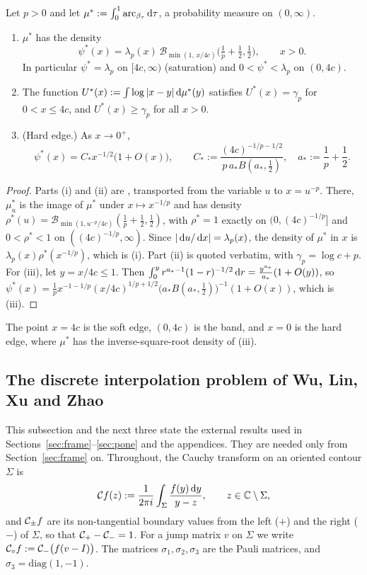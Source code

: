 \begin{proposition}\label{prop:equilibrium}
Let $p>0$ and let $\mu^*:=\int_0^1\mathrm{arc}_{\beta_\tau}\,\mathrm{d}\tau$, a probability measure on $(0,\infty)$.
\begin{enumerate}
\item[\textup{(i)}] $\mu^*$ has the density
  \[
    \psi^*(x)=\lambda_p(x)\,\mathcal B_{\min(1,\,x/4c)}\bigl(\tfrac1p+\tfrac12,\tfrac12\bigr),\qquad x>0 .
  \]
  In particular $\psi^*=\lambda_p$ on $[4c,\infty)$ (saturation) and $0<\psi^*<\lambda_p$ on $(0,4c)$.
\item[\textup{(ii)}] The function $U^*(x):=\int\log|x-y|\,\mathrm{d}\mu^*(y)$ satisfies $U^*(x)=\gamma_p$ for $0<x\le4c$, and
  $U^*(x)\ge\gamma_p$ for all $x>0$.
\item[\textup{(iii)}] \textup{(}Hard edge.\textup{)} As $x\to0^+$,
  \[
    \psi^*(x)=C_*x^{-1/2}\bigl(1+O(x)\bigr),\qquad C_*:=\frac{(4c)^{-1/p-1/2}}{p\,a_*B(a_*,\frac12)},\quad
    a_*:=\frac1p+\frac12 .
  \]
\end{enumerate}
\end{proposition}

\begin{proof}
Parts (i) and (ii) are \cite[Theorem~1.3(i)--(ii)]{Paper1}, transported from the variable $u$ to $x=u^{-p}$. There,
$\mu^*_u$ is the image of $\mu^*$ under $x\mapsto x^{-1/p}$ and has density
$\rho^*(u)=\mathcal B_{\min(1,u^{-p}/4c)}(\frac1p+\frac12,\frac12)$, with $\rho^*=1$ exactly on $(0,(4c)^{-1/p}]$ and
$0<\rho^*<1$ on $((4c)^{-1/p},\infty)$. Since $|\,\mathrm{d} u/\,\mathrm{d} x|=\lambda_p(x)$, the density of $\mu^*$ in $x$ is
$\lambda_p(x)\rho^*(x^{-1/p})$, which is (i). Part (ii) is quoted verbatim, with $\gamma_p=\log c+p$. For (iii), let
$y=x/4c\le1$. Then $\int_0^yr^{a_*-1}(1-r)^{-1/2}\,\mathrm{d} r=\frac{y^{a_*}}{a_*}(1+O(y))$, so
$\psi^*(x)=\frac1px^{-1-1/p}(x/4c)^{1/p+1/2}\bigl(a_*B(a_*,\frac12)\bigr)^{-1}(1+O(x))$, which is (iii).
\end{proof}

The point $x=4c$ is the soft edge, $(0,4c)$ is the band, and $x=0$ is the hard edge, where $\mu^*$ has the
inverse-square-root density of (iii).

\subsection{The discrete interpolation problem of Wu, Lin, Xu and Zhao}\label{sec:tool-wlxz}

This subsection and the next three state the external results used in Sections~\ref{sec:frame}--\ref{sec:pone} and
the appendices. They are needed only from Section~\ref{sec:frame} on. Throughout, the Cauchy transform on an oriented
contour $\Sigma$ is
\[
  \mathcal{C} f(z):=\frac1{2\pi i}\int_\Sigma\frac{f(y)\,\mathrm{d} y}{y-z},\qquad z\in\mathbb{C}\setminus\Sigma,
\]
and $\mathcal{C}_\pm f$ are its non-tangential boundary values from the left ($+$) and the right ($-$) of $\Sigma$, so that
$\mathcal{C}_+-\mathcal{C}_-=1$. For a jump matrix $v$ on $\Sigma$ we write $\mathcal{C}_vf:=\mathcal{C}_-\bigl(f(v-I)\bigr)$. The
matrices $\sigma_1,\sigma_2,\sigma_3$ are the Pauli matrices, and $\sigma_3=\mathrm{diag}(1,-1)$.

